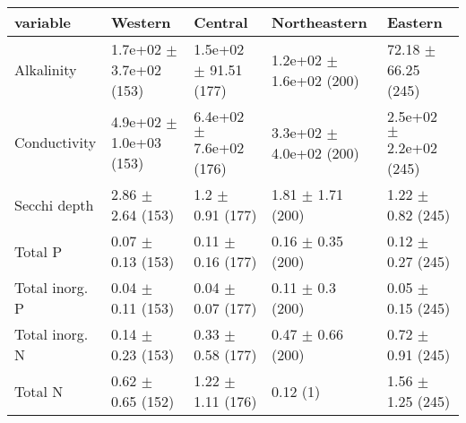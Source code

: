 \documentclass{article}
\begin{document}
\begin{landscape}
\begin{table}[!h]
\centering
\begin{tabular}{lllll}
\toprule
variable & Western & Central & Northeastern & Eastern\\
\midrule
Alkalinity & 1.7e+02 $\pm$ 3.7e+02 (153) & 1.5e+02 $\pm$ 91.51 (177) & 1.2e+02 $\pm$ 1.6e+02 (200) & 72.18 $\pm$ 66.25 (245)\\
Conductivity & 4.9e+02 $\pm$ 1.0e+03 (153) & 6.4e+02 $\pm$ 7.6e+02 (176) & 3.3e+02 $\pm$ 4.0e+02 (200) & 2.5e+02 $\pm$ 2.2e+02 (245)\\
Secchi depth & 2.86 $\pm$ 2.64 (153) & 1.2 $\pm$ 0.91 (177) & 1.81 $\pm$ 1.71 (200) & 1.22 $\pm$ 0.82 (245)\\
Total P & 0.07 $\pm$ 0.13 (153) & 0.11 $\pm$ 0.16 (177) & 0.16 $\pm$ 0.35 (200) & 0.12 $\pm$ 0.27 (245)\\
Total inorg. P & 0.04 $\pm$ 0.11 (153) & 0.04 $\pm$ 0.07 (177) & 0.11 $\pm$ 0.3 (200) & 0.05 $\pm$ 0.15 (245)\\
\addlinespace
Total inorg. N & 0.14 $\pm$ 0.23 (153) & 0.33 $\pm$ 0.58 (177) & 0.47 $\pm$ 0.66 (200) & 0.72 $\pm$ 0.91 (245)\\
Total N & 0.62 $\pm$ 0.65 (152) & 1.22 $\pm$ 1.11 (176) & 0.12 (1) & 1.56 $\pm$ 1.25 (245)\\
\bottomrule
\end{tabular}
\end{table}
\end{landscape}
\end{document}
